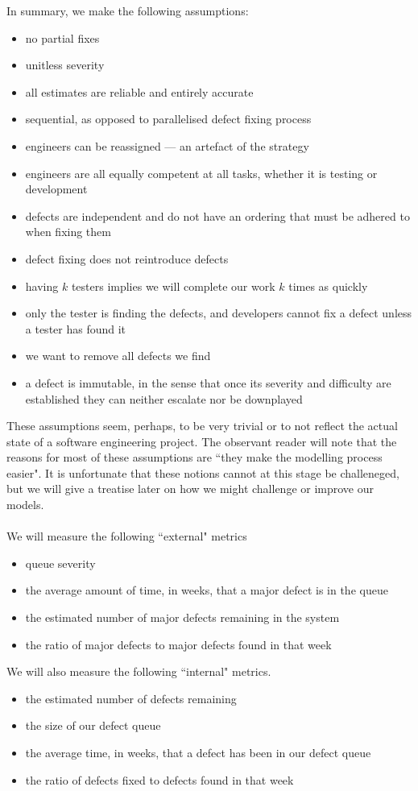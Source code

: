 In summary, we make the following assumptions:
\begin{itemize}
	\item no partial fixes
	\item unitless severity
	\item all estimates are reliable and entirely accurate
	\item sequential, as opposed to parallelised defect fixing process
	\item engineers can be reassigned --- an artefact of the strategy
	\item engineers are all equally competent at all tasks, whether it is testing or development
	\item defects are independent and do not have an ordering that must be adhered to when fixing them
	\item defect fixing does not reintroduce defects
	\item having $k$ testers implies we will complete our work $k$ times as quickly
	\item only the tester is finding the defects, and developers cannot fix a defect unless a tester
has found it
  \item we want to remove all defects we find
	\item a defect is immutable, in the sense that once its severity and difficulty are established
they can neither escalate nor be downplayed
\end{itemize}

These assumptions seem, perhaps, to be very trivial or to not reflect the actual state of a software
engineering project.
The observant reader will note that the reasons for most of these assumptions are ``they make the modelling
process easier".
It is unfortunate that these notions cannot at this stage be challeneged, but we will give a
treatise later on how we might challenge or improve our models.\\
\\
We will measure the following ``external" metrics
\begin{itemize}
	\item queue severity
	\item the average amount of time, in weeks, that a major defect is in the queue
	\item the estimated number of major defects remaining in the system
	\item the ratio of major defects to major defects found in that week
\end{itemize}

We will also measure the following ``internal" metrics.
\begin{itemize}
	\item the estimated number of defects remaining
	\item the size of our defect queue
	\item the average time, in weeks, that a defect has been in our defect queue
	\item the ratio of defects fixed to defects found in that week
\end{itemize}
